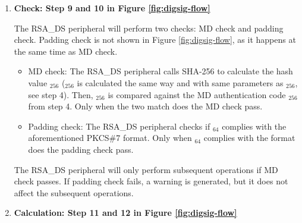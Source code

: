 \documentclass[main\_\_EN.tex]{subfiles}
\begin{document}
\begin{enumerate}
    \item {\bfseries Check: Step 9 and 10 in Figure \ref{fig:digsig-flow}}
        
        The RSA\_DS peripheral will perform two checks: MD check and padding check. Padding check is not shown in Figure \ref{fig:digsig-flow}, as it happens at the same time as MD check. 
        
        \begin{itemize}
    
            \item MD check: The RSA\_DS peripheral calls SHA-256 to calculate the hash value \begin{math}[CALC\_MD]_{256}\end{math} (\begin{math}[CALC\_MD]_{256}\end{math} is calculated the same way and with same parameters as \begin{math}[MD]_{256}\end{math}, see step 4). Then, \begin{math}[CALC\_MD]_{256}\end{math} is compared against the MD authentication code \begin{math}[MD]_{256}\end{math} from step 4. Only when the two match does the MD check pass.
            
            \item Padding check: The RSA\_DS peripheral checks if \begin{math}[\beta]_{64} \end{math} complies with the aforementioned PKCS\#7 format. Only when \begin{math}[\beta]_{64} \end{math} complies with the format does the padding check pass.
                    
        \end{itemize}
        
        The RSA\_DS peripheral will only perform subsequent operations if MD check passes. If padding check fails, a warning is generated, but it does not affect the subsequent operations.
    
    \item {\bfseries Calculation: Step 11 and 12 in Figure \ref{fig:digsig-flow}}
    

\end{enumerate}
\end{document}
